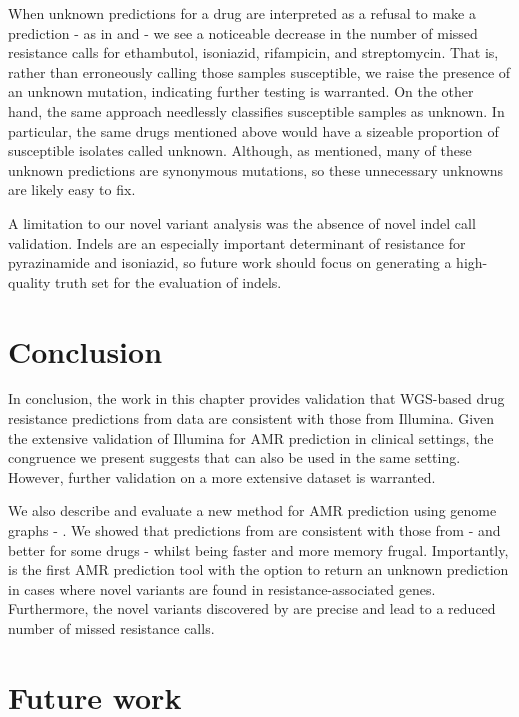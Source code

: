 When unknown predictions for a drug are interpreted as a refusal to make a prediction - as in \cite{cryptic2018} and \cite{hunt2019} - we see a noticeable decrease in the number of missed resistance calls for ethambutol, isoniazid, rifampicin, and streptomycin. That is, rather than erroneously calling those samples susceptible, we raise the presence of an unknown mutation, indicating further testing is warranted. On the other hand, the same approach needlessly classifies susceptible samples as unknown. In particular, the same drugs mentioned above would have a sizeable proportion of susceptible isolates called unknown. Although, as mentioned, many of these unknown predictions are synonymous mutations, so these unnecessary unknowns are likely easy to fix.

A limitation to our novel variant analysis was the absence of novel indel call validation. Indels are an especially important determinant of resistance for pyrazinamide and isoniazid, so future work should focus on generating a high-quality truth set for the evaluation of \drprg{} indels.

\section{Conclusion}
In conclusion, the work in this chapter provides validation that WGS-based drug resistance predictions from \ont{} data are consistent with those from Illumina. Given the extensive validation of Illumina for \mtb{} AMR prediction in clinical settings, the congruence we present suggests that \ont{} can also be used in the same setting. However, further validation on a more extensive dataset is warranted. 

We also describe and evaluate a new method for AMR prediction using genome graphs - \drprg{}. We showed that predictions from \drprg{} are consistent with those from \mykrobe{} - and better for some drugs - whilst being faster and more memory frugal. Importantly, \drprg{} is the first \mtb{} AMR prediction tool with the option to return an unknown prediction in cases where novel variants are found in resistance-associated genes. Furthermore, the novel variants discovered by \drprg{} are precise and lead to a reduced number of missed resistance calls.

\section{Future work}

